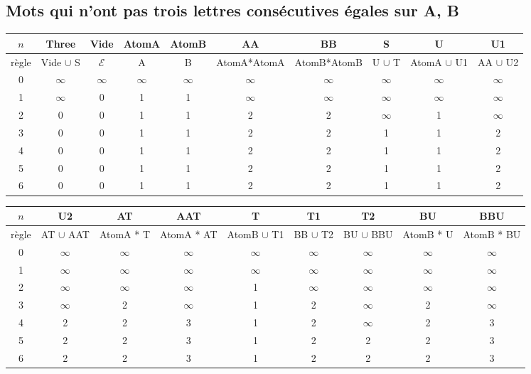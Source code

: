 \documentclass[a4paper, titlepage]{article}
\begin{document}
\begin{table}[!hbt]
\subsection{Mots qui n'ont pas trois lettres consécutives égales sur A, B}
\centering
\small
\setlength\tabcolsep{2pt}
\begin{tabular}{|c|ccccccccc|}
\hline $n$ & Three & Vide & AtomA & AtomB & AA & BB & S & U & U1 \\
\hline
\hline règle & Vide $\cup$ S & $\mathcal{E}$ & A & B & AtomA*AtomA &
AtomB*AtomB & U $\cup$ T & AtomA $\cup$ U1 & AA $\cup$ U2\\
\hline
\hline
0 & $\infty$ &  $\infty$ & $\infty$ & $\infty$ & $\infty$ & $\infty$ &
$\infty$ & $\infty$ & $\infty$ \\
1 & $\infty$ & 0  & 1 & 1 & $\infty$ & $\infty$ &
$\infty$ & $\infty$ & $\infty$ \\
2 & 0 & 0  & 1 & 1 & 2 & 2 &
$\infty$ & 1 & $\infty$ \\
3 & 0 & 0  & 1 & 1 & 2 & 2 &
1& 1 & 2 \\
4 & 0 & 0  & 1 & 1 & 2 & 2 &
1& 1 & 2 \\
5 & 0 & 0  & 1 & 1 & 2 & 2 &
1& 1 & 2 \\
6 & 0 & 0  & 1 & 1 & 2 & 2 &
1& 1 & 2 \\

\hline
\end{tabular}

\vspace{1cm}
\begin{tabular}{|c|cccccccc|}
\hline $n$ & U2 & AT & AAT & T & T1 & T2 & BU & BBU \\
\hline
\hline règle & AT $\cup$ AAT & AtomA * T & AtomA * AT & AtomB $\cup$
T1 & BB $\cup$ T2 & BU $\cup$ BBU & AtomB * U & AtomB * BU\\
\hline
0 & $\infty$ &  $\infty$ & $\infty$ & $\infty$ & $\infty$ & $\infty$ &
$\infty$ & $\infty$  \\
1 & $\infty$ &  $\infty$ & $\infty$ & $\infty$ & $\infty$ & $\infty$ &
$\infty$ & $\infty$  \\
2 & $\infty$ &  $\infty$ & $\infty$ & 1 & $\infty$ & $\infty$ &
$\infty$ & $\infty$  \\
3 & $\infty$ & 2 & $\infty$ & 1 & 2 & $\infty$ &
2 & $\infty$  \\
4 & 2 & 2 & 3 & 1 & 2 & $\infty$ &
2 & 3  \\
5 & 2 & 2 & 3 & 1 & 2 & 2 &
2 & 3  \\
6 & 2 & 2 & 3 & 1 & 2 & 2 &
2 & 3  \\

\hline
\end {tabular}
\end{table}
\end{document}
